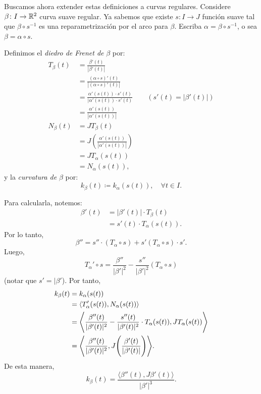 \begin{note}
	Buscamos ahora extender estas definiciones a curvas regulares. Considere $\beta \colon I \to \mathbb{R}^{2}$ curva suave regular. Ya sabemos que existe $s \colon I \to J$ función suave tal que $\beta \circ s^{-1}$ es una reparametrización por el arco para $\beta$. Escriba $\alpha = \beta \circ s^{-1}$, o sea $\beta = \alpha \circ s$. \par
	Definimos el \textit{diedro de Frenet de} $\beta$ por:
	\begin{align*}
		T_{\beta}(t) &= \frac{\beta'(t)}{|\beta'(t)|} \\
		&= \frac{(\alpha \circ s)'(t)}{|(\alpha \circ s)'(t)|} \\
		&= \frac{\alpha'(s(t)) \cdot s'(t)}{|\alpha'(s(t)) \cdot s'(t)} \qquad (s'(t) = |\beta'(t)|) \\ 
		&= \frac{\alpha'(s(t))}{|\alpha'(s(t))|} \\
		N_{\beta} (t) &= JT_{\beta}(t) \\
		&= J \left( \frac{\alpha'(s(t))}{|\alpha'(s(t))|} \right) \\
		&= JT_{\alpha}(s(t)) \\
		&= N_{\alpha}(s(t))
	,\end{align*}
	y la \textit{curvatura de} $\beta$ por:
	\[ k_{\beta}(t) \coloneq k_{\alpha}(s(t)), \quad \forall t \in I. \]
	\par Para calcularla, notemos:
	\begin{align*}
		\beta'(t) &= |\beta'(t)| \cdot T_{\beta}(t) \\
		&= s'(t) \cdot T_{\alpha}(s(t))
	.\end{align*}
	Por lo tanto,
	\[ \beta'' = s'' \cdot (T_{\alpha} \circ s) + s'(T_{\alpha} \circ s) \cdot s'. \]
	Luego,
	\[ T_{\alpha}' \circ s = \frac{\beta''}{|\beta'|^{2}} - \frac{s''}{|\beta'|^{2}}(T_{\alpha} \circ s) \]
	(notar que $s' = |\beta'$). Por tanto,
	\begin{align*}
		k_{\beta}(t) &= k_{\alpha}(s(t)) \\
		&= \langle T_{\alpha}'(s(t)), N_{\alpha}(s(t)) \rangle \\
		&= \Bigg{\langle} \frac{\beta''(t)}{|\beta'(t)|^{2}} - \frac{s''(t)}{|\beta'(t)|^{2}} \cdot T_{\alpha}(s(t)), JT_{\alpha}(s(t)) \Bigg{\rangle} \\
		&= \Bigg{\langle} \frac{\beta''(t)}{|\beta'(t)|^{2}}, J \Bigg( \frac{\beta'(t)}{|\beta'(t)|} \Bigg) \Bigg{\rangle}
	.\end{align*}
	De esta manera,
	\[ k_{\beta}(t) = \frac{\langle \beta''(t), J \beta'(t) \rangle}{|\beta'|^{3}}. \]
\end{note}

